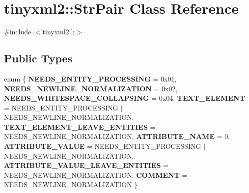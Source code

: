 \section{tinyxml2\+::Str\+Pair Class Reference}
\label{classtinyxml2_1_1_str_pair}


{\ttfamily \#include $<$tinyxml2.\+h$>$}

\subsection*{Public Types}
\begin{DoxyCompactItemize}
\item 
enum \{ \newline
\textbf{ N\+E\+E\+D\+S\+\_\+\+E\+N\+T\+I\+T\+Y\+\_\+\+P\+R\+O\+C\+E\+S\+S\+I\+NG} = 0x01, 
\textbf{ N\+E\+E\+D\+S\+\_\+\+N\+E\+W\+L\+I\+N\+E\+\_\+\+N\+O\+R\+M\+A\+L\+I\+Z\+A\+T\+I\+ON} = 0x02, 
\textbf{ N\+E\+E\+D\+S\+\_\+\+W\+H\+I\+T\+E\+S\+P\+A\+C\+E\+\_\+\+C\+O\+L\+L\+A\+P\+S\+I\+NG} = 0x04, 
\textbf{ T\+E\+X\+T\+\_\+\+E\+L\+E\+M\+E\+NT} = N\+E\+E\+D\+S\+\_\+\+E\+N\+T\+I\+T\+Y\+\_\+\+P\+R\+O\+C\+E\+S\+S\+I\+NG $\vert$ N\+E\+E\+D\+S\+\_\+\+N\+E\+W\+L\+I\+N\+E\+\_\+\+N\+O\+R\+M\+A\+L\+I\+Z\+A\+T\+I\+ON, 
\newline
\textbf{ T\+E\+X\+T\+\_\+\+E\+L\+E\+M\+E\+N\+T\+\_\+\+L\+E\+A\+V\+E\+\_\+\+E\+N\+T\+I\+T\+I\+ES} = N\+E\+E\+D\+S\+\_\+\+N\+E\+W\+L\+I\+N\+E\+\_\+\+N\+O\+R\+M\+A\+L\+I\+Z\+A\+T\+I\+ON, 
\textbf{ A\+T\+T\+R\+I\+B\+U\+T\+E\+\_\+\+N\+A\+ME} = 0, 
\textbf{ A\+T\+T\+R\+I\+B\+U\+T\+E\+\_\+\+V\+A\+L\+UE} = N\+E\+E\+D\+S\+\_\+\+E\+N\+T\+I\+T\+Y\+\_\+\+P\+R\+O\+C\+E\+S\+S\+I\+NG $\vert$ N\+E\+E\+D\+S\+\_\+\+N\+E\+W\+L\+I\+N\+E\+\_\+\+N\+O\+R\+M\+A\+L\+I\+Z\+A\+T\+I\+ON, 
\textbf{ A\+T\+T\+R\+I\+B\+U\+T\+E\+\_\+\+V\+A\+L\+U\+E\+\_\+\+L\+E\+A\+V\+E\+\_\+\+E\+N\+T\+I\+T\+I\+ES} = N\+E\+E\+D\+S\+\_\+\+N\+E\+W\+L\+I\+N\+E\+\_\+\+N\+O\+R\+M\+A\+L\+I\+Z\+A\+T\+I\+ON, 
\newline
\textbf{ C\+O\+M\+M\+E\+NT} = N\+E\+E\+D\+S\+\_\+\+N\+E\+W\+L\+I\+N\+E\+\_\+\+N\+O\+R\+M\+A\+L\+I\+Z\+A\+T\+I\+ON
 \}
\end{DoxyCompactItemize}
